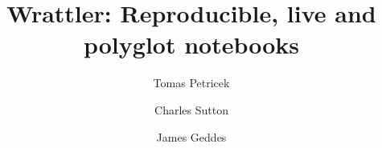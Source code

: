 \documentclass[sigplan]{acmart}\settopmatter{printfolios=true,printccs=false,printacmref=false}
\begin{document}
\title{Wrattler: \textnormal{Reproducible, live and polyglot notebooks}}

\author{Tomas Petricek}
\author{Charles Sutton}
\author{James Geddes}

\newcommand{\vect}[1]{\langl #1 \rangl}
\newcommand{\langl}{\begin{picture}(4.5,7)
\put(1.1,2.5){\rotatebox{60}{\line(1,0){5.5}}}
\put(1.1,2.5){\rotatebox{300}{\line(1,0){5.5}}}
\end{picture}}
\newcommand{\rangl}{\begin{picture}(4.5,7)
\put(.9,2.5){\rotatebox{120}{\line(1,0){5.5}}}
\put(.9,2.5){\rotatebox{240}{\line(1,0){5.5}}}
\end{picture}}
\newcommand{\ball}[1]{\FPeval{\result}{clip(201+#1)}\textnormal{\ding{\result}}}
\newcommand{\lsep}{~\,|\,~}
\newcommand{\num}[1]{\textcolor{numclr}{#1}}
\newcommand{\str}[1]{\textnormal{\textcolor{strclr}{\sffamily "#1"}}}
\newcommand{\strf}[1]{\textnormal{\textcolor{strclr}{\sffamily #1}}}
\newcommand{\rstr}[1]{\textnormal{\textcolor{rstrclr}{\sffamily "#1"}}}
\newcommand{\ident}[1]{\textnormal{\sffamily #1}}
\newcommand{\qident}[1]{\textnormal{\sffamily \textquotesingle #1\textquotesingle}}
\newcommand{\dom}{\ident{dom}}
\newcommand{\kvd}[1]{\textnormal{\textcolor{kvdclr}{\sffamily #1}}}

\newcommand{\bndclr}[1]{\textcolor{kvdclr}{#1}}
\newcommand{\bkndclr}[1]{\textcolor{prepclr}{#1}}
\newcommand{\blblclr}[1]{\textcolor{numclr}{#1}}
\newcommand{\bnd}[1]{\textnormal{\textcolor{kvdclr}{\sffamily #1}}}
\newcommand{\bknd}[1]{\textnormal{\textcolor{prepclr}{\sffamily #1}}}
\newcommand{\blbl}[1]{\textnormal{\textcolor{numclr}{\sffamily #1}}}
\end{document}
